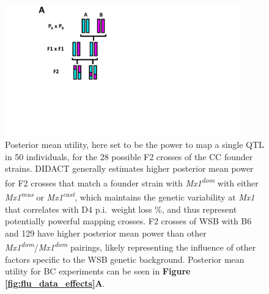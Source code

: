 \begin{figure}
\renewcommand{\familydefault}{\sfdefault}\normalfont
\centering
\includegraphics[width=0.9\textwidth, page=6, trim={3.6in 0.5in 3.5in 0.5in}, clip]{figures/2-didact/mapping_crosses.pdf}
\caption[Mean posterior utility for day 4 weight loss \% post Influenza A infection in F2 crosses]{Posterior mean utility, here set to be the power to map a single QTL in 50 individuals, for the 28 possible F2 crosses of the CC founder strains. DIDACT generally estimates higher posterior mean power for F2 crosses that match a founder strain with \textit{Mx1}\textsuperscript{\textit{dom}} with either \textit{Mx1}\textsuperscript{\textit{mus}} or \textit{Mx1}\textsuperscript{\textit{cast}}, which maintains the genetic variability at \textit{Mx1} that correlates with D4 p.i.\ weight loss \%, and thus represent potentially powerful mapping crosses. F2 crosses of WSB with B6 and 129 have higher posterior mean power than other \textit{Mx1}\textsuperscript{\textit{dom}}/\textit{Mx1}\textsuperscript{\textit{dom}} pairings, likely representing the influence of other factors specific to the WSB genetic background. Posterior mean utility for BC experiments can be seen in \textbf{Figure \ref{fig:flu_data_effects}A}.\label{fig:didact_flu_f2}}
\end{figure}

